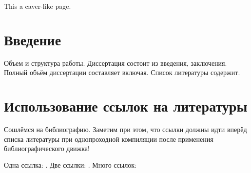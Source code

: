 \documentclass[a4paper, 12pt, oneside, openany]{article}
\begin{document}
    This a caver-like page.
    
    \newpage\section{Введение}
    Объем и структура работы. Диссертация состоит из введения,
    заключения. Полный объём диссертации составляет включая. 
    Список литературы содержит.
    

    
    
    
    \pagebreak
    \section{Использование ссылок на литературы}
    Сошлёмся на библиографию. Заметим при этом, что ссылки должны идти вперёд списка литературы 
    при однопроходной компиляции после применения библиографического движка!
    

    Одна ссылка:    \cite[с.~54]{Sokolov} \cite[с.~36]{Gaidaenko}.
    Две ссылки:     \cite{Sokolov, Gaidaenko}.
    Много ссылок:   \cite{Lermontov, Management, Borozda, Marketing, Constitution, FamilyCode,
    Gost.7.0.53, Razumovski, Lagkueva, Pokrovski, Methodology, Berestova, Kriger}
    
    \insertBiblio
\end{document}
